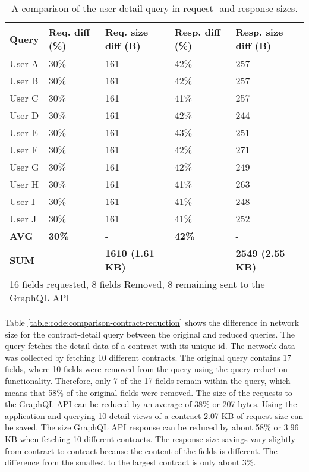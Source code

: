 \ifshowTables
\begin{table}[!htbp]
  \begin{tabular}{|l|l|l|l|l|}
  \hline
  \textbf{Query} & \textbf{Req. diff (\%)} & \textbf{Req. size diff (B)} & \textbf{Resp. diff (\%)} & \textbf{Resp. size diff (B)} \\
  \hline
  User A & 30\% & 161 & 42\% & 257 \\
  \hline
  User B & 30\% & 161 & 42\% & 257 \\
  \hline
  User C & 30\% & 161 & 41\% & 257 \\
  \hline
  User D & 30\% & 161 & 42\% & 244 \\
  \hline
  User E & 30\% & 161 & 43\% & 251 \\
  \hline
  User F & 30\% & 161 & 42\% & 271 \\
  \hline
  User G & 30\% & 161 & 42\% & 249 \\
  \hline
  User H & 30\% & 161 & 41\% & 263 \\
  \hline
  User I & 30\% & 161 & 41\% & 248 \\
  \hline
  User J & 30\% & 161 & 41\% & 252 \\
  \hline
  \hline
  \textbf{AVG} & \textbf{30\%} & - & \textbf{42\%} & -  \\
  \hline
  \hline
  \textbf{SUM} & - & \textbf{1610 (1.61 KB)} & - & \textbf{2549 (2.55 KB)} \\
  \hline
  \multicolumn{5}{l}{16 fields requested, 8 fields Removed, 8 remaining sent to the GraphQL \ac{API}}
  \end{tabular}
  \caption{A comparison of the user-detail query in request- and response-sizes.}\label{table:code:comparison-user-reduction}
\end{table}
\fi


\noindent Table \ref{table:code:comparison-contract-reduction} shows the difference in network size for the contract-detail query between the original and reduced queries. The query fetches the detail data of a contract with its unique id. The network data was collected by fetching 10 different contracts. The original query contains 17 fields, where 10 fields were removed from the query using the query reduction functionality. Therefore, only 7 of the 17 fields remain within the query, which means that 58\% of the original fields were removed. The size of the requests to the GraphQL \ac{API} can be reduced by an average of 38\% or 207 bytes. Using the application and querying 10 detail views of a contract 2.07 KB of request size can be saved. The size GraphQL \ac{API} response can be reduced by about 58\% or 3.96 KB when fetching 10 different contracts. The response size savings vary slightly from contract to contract because the content of the fields is different. The difference from the smallest to the largest contract is only about 3\%.

